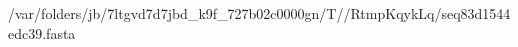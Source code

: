\documentclass[10pt]{article}
\begin{document}
\begin{texshade}{/var/folders/jb/7ltgvd7d7jbd_k9f_727b02c0000gn/T//RtmpKqykLq/seq83d1544edc39.fasta}
\hideconsensus
{}
\hidelogoscale
{}
\showlegend
\end{texshade}
\end{document}
